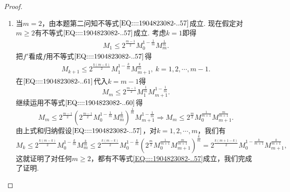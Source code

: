 \documentclass[../../main.tex]{subfiles}
\begin{document}
\begin{proof}
\begin{enumerate}
\item 当\( m = 2 \)，由本题第二问知不等式\(\eqref{EQ::::1904823082-..57}\)成立. 现在假定对\( m \geqslant 2 \)有不等式\(\eqref{EQ::::1904823082-..57}\)成立. 考虑\( k = 1 \)即得
\begin{align}
M_1 \leqslant 2^{\frac{m - 1}{2}} M_0^{1 - \frac{1}{m}} M_m^{\frac{1}{m}}. \label{EQ::::1904823082-..60}
\end{align}
把\( f' \)看成\( f \)用不等式\(\eqref{EQ::::1904823082-..57}\)得
\begin{align}
M_{k + 1} \leqslant 2^{\frac{k(m - k)}{2}} M_1^{1 - \frac{k}{m}} M_{m + 1}^{\frac{k}{m}}, \ k = 1,2,\cdots, m - 1. \label{EQ::::1904823082-..61}
\end{align}
在\(\eqref{EQ::::1904823082-..61}\)代入\( k = m - 1 \)得
\[
M_m \leqslant 2^{\frac{m - 1}{2}} M_1^{\frac{1}{m}} M_{m + 1}^{1 - \frac{1}{m}}.
\]
继续运用不等式\(\eqref{EQ::::1904823082-..60}\)得
\[
M_m \leqslant 2^{\frac{m - 1}{2}} \left( 2^{\frac{m - 1}{2}} M_0^{1 - \frac{1}{m}} M_m^{\frac{1}{m}} \right)^{\frac{1}{m}} M_{m + 1}^{1 - \frac{1}{m}} \Rightarrow M_m \leqslant 2^{\frac{m}{2}} M_0^{\frac{1}{m + 1}} M_{m + 1}^{\frac{m}{m + 1}}.
\]
由上式和归纳假设\(\eqref{EQ::::1904823082-..57}\)，对\( k = 1,2,\cdots, m \)，我们有
\[
M_k \leqslant 2^{\frac{k(m - k)}{2}} M_0^{1 - \frac{k}{m}} M_m^{\frac{k}{m}} \leqslant 2^{\frac{k(m - k)}{2}} M_0^{1 - \frac{k}{m}} \left( 2^{\frac{m}{2}} M_0^{\frac{1}{m + 1}} M_{m + 1}^{\frac{m}{m + 1}} \right)^{\frac{k}{m}} = 2^{\frac{k(m + 1 - k)}{2}} M_0^{1 - \frac{k}{m + 1}} M_{m + 1}^{\frac{k}{m + 1}},
\]
这就证明了对任何\( m \geqslant 2 \)，都有不等式\eqref{EQ::::1904823082-..57}成立，我们完成了证明.
\end{enumerate}
\end{proof}
\end{document}
